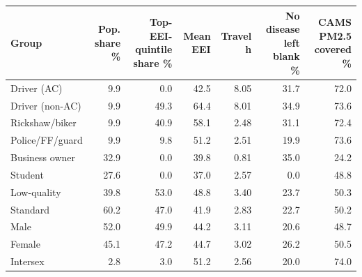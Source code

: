 \begin{tabular}{lrrrrrr}
\toprule
Group & Pop. share \% & Top-EEI-quintile share \% & Mean EEI & Travel h & No disease left blank \% & CAMS PM2.5 covered \% \\
\midrule
Driver (AC) & 9.9 & 0.0 & 42.5 & 8.05 & 31.7 & 72.0 \\
Driver (non-AC) & 9.9 & 49.3 & 64.4 & 8.01 & 34.9 & 73.6 \\
Rickshaw/biker & 9.9 & 40.9 & 58.1 & 2.48 & 31.1 & 72.4 \\
Police/FF/guard & 9.9 & 9.8 & 51.2 & 2.51 & 19.9 & 73.6 \\
Business owner & 32.9 & 0.0 & 39.8 & 0.81 & 35.0 & 24.2 \\
Student & 27.6 & 0.0 & 37.0 & 2.57 & 0.0 & 48.8 \\
\midrule
Low-quality & 39.8 & 53.0 & 48.8 & 3.40 & 23.7 & 50.3 \\
Standard & 60.2 & 47.0 & 41.9 & 2.83 & 22.7 & 50.2 \\
\midrule
Male & 52.0 & 49.9 & 44.2 & 3.11 & 20.6 & 48.7 \\
Female & 45.1 & 47.2 & 44.7 & 3.02 & 26.2 & 50.5 \\
Intersex & 2.8 & 3.0 & 51.2 & 2.56 & 20.0 & 74.0 \\
\bottomrule
\end{tabular}
